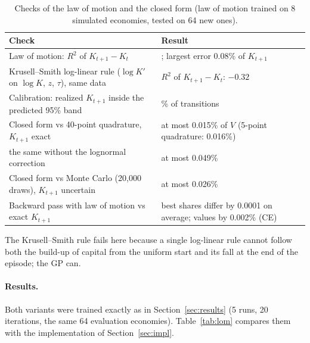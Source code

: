 \documentclass[11pt,a4paper]{article}
\begin{document}
\begin{table}[h]
\centering
\small
\caption{Checks of the law of motion and the closed form (law of motion trained on 8 simulated
economies, tested on 64 new ones).}
\label{tab:lomchecks}
\begin{tabularx}{\linewidth}{@{}>{\raggedright\arraybackslash}X>{\raggedright\arraybackslash}p{6.3cm}@{}}
\toprule
Check & Result \\
\midrule
Law of motion: $R^2$ of $K_{t+1} - K_t$ & 0.999996; largest error 0.08\% of $K_{t+1}$ \\
Krusell--Smith log-linear rule ($\log K'$ on $\log K$, $z$, $\tau$), same data & $R^2$ of $K_{t+1} - K_t$: $-0.32$ \\
Calibration: realized $K_{t+1}$ inside the predicted 95\% band & 89\% of transitions \\
Closed form vs 40-point quadrature, $K_{t+1}$ exact & at most 0.015\% of $V$ (5-point quadrature: 0.016\%) \\
\quad the same without the lognormal correction & at most 0.049\% \\
Closed form vs Monte Carlo (20{,}000 draws), $K_{t+1}$ uncertain & at most 0.026\% \\
Backward pass with law of motion vs exact $K_{t+1}$ & best shares differ by 0.0001 on average;
values by 0.002\% (CE) \\
\bottomrule
\end{tabularx}
\end{table}

The Krusell--Smith rule fails here because a single log-linear rule cannot follow both the build-up
of capital from the uniform start and its fall at the end of the episode; the GP can.

\paragraph{Results.} Both variants were trained exactly as in Section~\ref{sec:results} (5 runs,
20 iterations, the same 64 evaluation economies). Table~\ref{tab:lom} compares them with the
implementation of Section~\ref{sec:impl}.
\end{document}
